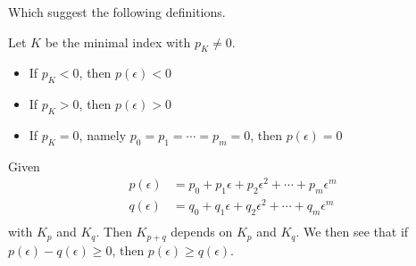 Which suggest the following definitions.

\begin{definition}\label{def:sign-of-polynomial-in-epsilon}
	Let \(K\) be the minimal index with \(p_K \neq 0\).
	\begin{itemize}
		\item If \(p_K < 0\), then \(p(\epsilon) < 0\)
		\item If \(p_K > 0\), then \(p(\epsilon) > 0\)
		\item If \(p_K = 0\), namely \(p_0 = p_1 = \cdots = p_m = 0\), then \(p(\epsilon) = 0\)
	\end{itemize}
\end{definition}

\begin{note}
	Given
	\[
		\begin{split}
			p(\epsilon) &= p_0 + p_1\epsilon + p_2 \epsilon^2 + \cdots + p_{m}\epsilon^m	\\
			q(\epsilon) &= q_0 + q_1\epsilon + q_2 \epsilon^2 + \cdots + q_{m}\epsilon^m	\\
		\end{split}
	\]
	with \(K_p\) and \(K_q\). Then \(K_{p+q}\) depends on \(K_p\) and \(K_q\). We then see that if \(p(\epsilon) - q(\epsilon) \geq 0\), then
	\(p(\epsilon) \geq  q(\epsilon)\).
\end{note}

